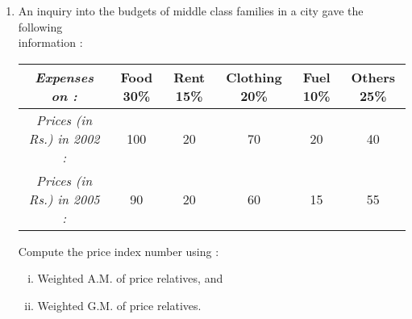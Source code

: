 \documentclass[11pt, a4paper]{article}
\begin{document}
\begin{enumerate}
	
	
	
	\item An inquiry into the budgets of middle class families in a city gave the following \\ information :
	
	\begin{table}[h]
	\def\arraystretch{1.5}
	
	\begin{center}
	\begin{tabular}{|c||c|c|c|c|c|}
	
	\hline
	
	\textit{Expenses on :} & Food 30\% & Rent 15\% & Clothing 20\% & Fuel 10\% & Others 25\% \\
	
	\hline
	
	\textit{Prices (in Rs.) in 2002 :} & 100 & 20 & 70 & 20 & 40 \\
	
	\textit{Prices (in Rs.) in 2005 :} & 90 & 20 & 60 & 15 & 55 \\
	
	\hline
	
	\end{tabular}
	\end{center}
	
	\end{table}
	
	
	Compute the price index number using :
	
	\begin{enumerate}[(i)]
		\item Weighted A.M. of price relatives, and
		
		\item Weighted G.M. of price relatives.
	
	\end{enumerate}
\end{enumerate}
\end{document}
